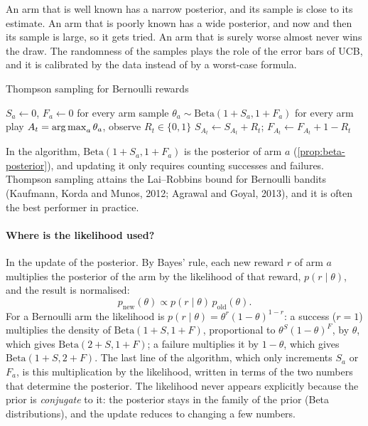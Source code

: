 \begin{intuition}
  An arm that is well known has a narrow posterior, and its sample is close
  to its estimate. An arm that is poorly known has a wide posterior, and
  now and then its sample is large, so it gets tried. An arm that is
  surely worse almost never wins the draw. The randomness of the samples
  plays the role of the error bars of UCB, and it is calibrated by the
  data instead of by a worst-case formula.
\end{intuition}

\begin{algobox}{Thompson sampling for Bernoulli rewards}
  \begin{algorithmic}[1]
    \State $S_a \gets 0$, $F_a \gets 0$ for every arm
      \State sample $\theta_a \sim \mathrm{Beta}(1 + S_a, 1 + F_a)$ for
        every arm
      \State play $A_t = \operatorname*{arg\,max}_a \theta_a$, observe $R_t \in \{0, 1\}$
      \State $S_{A_t} \gets S_{A_t} + R_t$;\quad
        $F_{A_t} \gets F_{A_t} + 1 - R_t$
    \EndFor
  \end{algorithmic}
\end{algobox}

In the algorithm, $\mathrm{Beta}(1 + S_a, 1 + F_a)$ is the posterior of
arm $a$ (\cref{prop:beta-posterior}), and updating it only requires
counting successes and failures. Thompson sampling attains the
Lai--Robbins bound for Bernoulli bandits (Kaufmann, Korda and Munos, 2012;
Agrawal and Goyal, 2013), and it is often the best performer in practice.

\paragraph{Where is the likelihood used?} In the update of the posterior.
By Bayes' rule, each new reward $r$ of arm $a$ multiplies the posterior of
the arm by the likelihood of that reward, $p(r \mid \theta)$, and the
result is normalised:
\begin{equation}
  \label{eq:bayes-update}
  p_{\text{new}}(\theta) \propto p(r \mid \theta)\, p_{\text{old}}(\theta).
\end{equation}
For a Bernoulli arm the likelihood is $p(r \mid \theta) = \theta^r (1 -
\theta)^{1 - r}$: a success ($r = 1$) multiplies the density of
$\mathrm{Beta}(1 + S, 1 + F)$, proportional to $\theta^S (1 - \theta)^F$,
by $\theta$, which gives $\mathrm{Beta}(2 + S, 1 + F)$; a failure
multiplies it by $1 - \theta$, which gives $\mathrm{Beta}(1 + S, 2 + F)$.
The last line of the algorithm, which only increments $S_a$ or $F_a$, is
this multiplication by the likelihood, written in terms of the two numbers
that determine the posterior. The likelihood never appears explicitly
because the prior is \emph{conjugate} to it: the posterior stays in the
family of the prior (Beta distributions), and the update reduces to
changing a few numbers.


